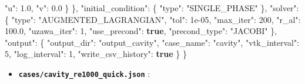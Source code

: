 \documentclass[
  10pt,
]{article}
\newenvironment{Shaded}{}{}
\newcommand{\DataTypeTok}[1]{\textcolor[rgb]{0.56,0.13,0.00}{#1}}
\newcommand{\DecValTok}[1]{\textcolor[rgb]{0.25,0.63,0.44}{#1}}
\newcommand{\FloatTok}[1]{\textcolor[rgb]{0.25,0.63,0.44}{#1}}
\newcommand{\FunctionTok}[1]{\textcolor[rgb]{0.02,0.16,0.49}{#1}}
\newcommand{\KeywordTok}[1]{\textcolor[rgb]{0.00,0.44,0.13}{\textbf{#1}}}
\newcommand{\StringTok}[1]{\textcolor[rgb]{0.25,0.44,0.63}{#1}}
\providecommand{\tightlist}{%
  \setlength{\itemsep}{0pt}\setlength{\parskip}{0pt}}
\begin{document}
\begin{Shaded}
\begin{Highlighting}[]
      \DataTypeTok{"u"}\FunctionTok{:} \FloatTok{1.0}\FunctionTok{,}
      \DataTypeTok{"v"}\FunctionTok{:} \FloatTok{0.0}
    \FunctionTok{\}}
  \FunctionTok{\},}
  \DataTypeTok{"initial\_condition"}\FunctionTok{:} \FunctionTok{\{}
    \DataTypeTok{"type"}\FunctionTok{:} \StringTok{"SINGLE\_PHASE"}
  \FunctionTok{\},}
  \DataTypeTok{"solver"}\FunctionTok{:} \FunctionTok{\{}
    \DataTypeTok{"type"}\FunctionTok{:} \StringTok{"AUGMENTED\_LAGRANGIAN"}\FunctionTok{,}
    \DataTypeTok{"tol"}\FunctionTok{:} \DecValTok{1e{-}05}\FunctionTok{,}
    \DataTypeTok{"max\_iter"}\FunctionTok{:} \DecValTok{200}\FunctionTok{,}
    \DataTypeTok{"r\_al"}\FunctionTok{:} \FloatTok{100.0}\FunctionTok{,}
    \DataTypeTok{"uzawa\_iter"}\FunctionTok{:} \DecValTok{1}\FunctionTok{,}
    \DataTypeTok{"use\_precond"}\FunctionTok{:} \KeywordTok{true}\FunctionTok{,}
    \DataTypeTok{"precond\_type"}\FunctionTok{:} \StringTok{"JACOBI"}
  \FunctionTok{\},}
  \DataTypeTok{"output"}\FunctionTok{:} \FunctionTok{\{}
    \DataTypeTok{"output\_dir"}\FunctionTok{:} \StringTok{"output\_cavity"}\FunctionTok{,}
    \DataTypeTok{"case\_name"}\FunctionTok{:} \StringTok{"cavity"}\FunctionTok{,}
    \DataTypeTok{"vtk\_interval"}\FunctionTok{:} \DecValTok{5}\FunctionTok{,}
    \DataTypeTok{"log\_interval"}\FunctionTok{:} \DecValTok{1}\FunctionTok{,}
    \DataTypeTok{"write\_csv\_history"}\FunctionTok{:} \KeywordTok{true}
  \FunctionTok{\}}
\FunctionTok{\}}
\end{Highlighting}
\end{Shaded}

\begin{itemize}
\tightlist
\item
  \textbf{\texttt{cases/cavity\_re1000\_quick.json}} :
\end{itemize}
\end{document}
